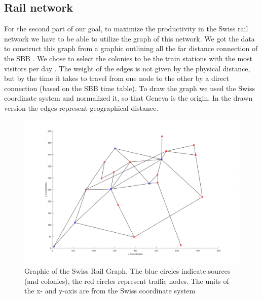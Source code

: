 \subsection{Rail network}
For the second part of our goal, to maximize the productivity in the Swiss rail network we have to be able to utilize the graph of this network. We got the data to construct this graph from a graphic outlining all the far distance connection of the SBB \citep{SbbStats2}. We chose to select the colonies to be the train stations with the most visitors per day \citep{SbbStats1}. The weight of the edges is not given by the physical distance, but by the time it takes to travel from one node to the other by a direct connection (based on the SBB time table)\citep{SbbStats3}. To draw the graph we used the Swiss coordinate system and normalized it, so that Geneva is the origin. In the drawn version the edges represent geographical distance.

\begin{figure}[H]
	\centering
	\includegraphics[scale=0.8]{sbbEmpty.pdf}
	\caption{Graphic of the Swiss Rail Graph. The blue circles indicate sources (and colonies), the red circles represent traffic nodes. The units of the x- and y-axis are from the Swiss coordinate system}
\end{figure}